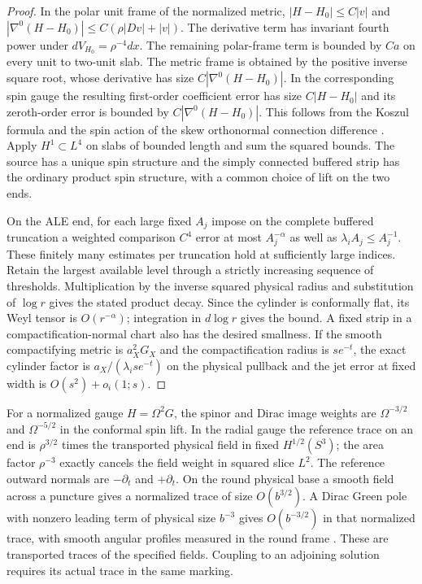 \documentclass[11pt]{article}
\theoremstyle{definition}
\theoremstyle{remark}
\begin{document}
\begin{proof}
In the polar unit frame of the normalized metric, \(|H-H_0|\le C|v|\) and \(|\nabla^0(H-H_0)|\le C(\rho|Dv|+|v|)\). The derivative term has invariant fourth power under \(dV_{H_0}=\rho^{-4}dx\). The remaining polar-frame term is bounded by \(Ca\) on every unit to two-unit slab. The metric frame is obtained by the positive inverse square root, whose derivative has size \(C|\nabla^0(H-H_0)|\). In the corresponding spin gauge the resulting first-order coefficient error has size \(C|H-H_0|\) and its zeroth-order error is bounded by \(C|\nabla^0(H-H_0)|\). This follows from the Koszul formula and the spin action of the skew orthonormal connection difference \cite[Proposition 1.6 and \S2]{BourguignonGauduchon1992}. Apply \(H^1\subset L^4\) on slabs of bounded length and sum the squared bounds. The source has a unique spin structure and the simply connected buffered strip has the ordinary product spin structure, with a common choice of lift on the two ends.

On the ALE end, for each large fixed \(A_j\) impose on the complete buffered truncation a weighted comparison \(C^4\) error at most \(A_j^{-\alpha}\) as well as \(\lambda_i A_j\le A_j^{-1}\). These finitely many estimates per truncation hold at sufficiently large indices. Retain the largest available level through a strictly increasing sequence of thresholds. Multiplication by the inverse squared physical radius and substitution of \(\log r\) gives the stated product decay. Since the cylinder is conformally flat, its Weyl tensor is \(O(r^{-\alpha})\); integration in \(d\log r\) gives the bound. A fixed strip in a compactification-normal chart also has the desired smallness. If the smooth compactifying metric is \(a_X^2G_X\) and the compactification radius is \(s e^{-t}\), the exact cylinder factor is \(a_X/(\lambda_i s e^{-t})\) on the physical pullback and the jet error at fixed width is \(O(s^2)+o_i(1;s)\).
\end{proof}

For a normalized gauge \(H=\Omega^2G\), the spinor and Dirac image weights are \(\Omega^{-3/2}\) and \(\Omega^{-5/2}\) in the conformal spin lift. In the radial gauge the reference trace on an end is \(\rho^{3/2}\) times the transported physical field in fixed \(H^{1/2}(S^3)\); the area factor \(\rho^{-3}\) exactly cancels the field weight in squared slice \(L^2\). The reference outward normals are \(-\partial_t\) and \(+\partial_t\). On the round physical base a smooth field across a puncture gives a normalized trace of size \(O(b^{3/2})\). A Dirac Green pole with nonzero leading term of physical size \(b^{-3}\) gives \(O(b^{-3/2})\) in that normalized trace, with smooth angular profiles measured in the round frame \cite[\S4.1]{Baker2026DiracYamabe}. These are transported traces of the specified fields. Coupling to an adjoining solution requires its actual trace in the same marking.
\end{document}
